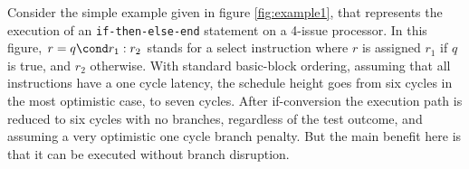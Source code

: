 Consider the simple example given in figure \ref{fig:example1}, that represents the execution of an \texttt{if-then-else-end} statement on a 4-issue processor. In this figure, $r=q\cond r_1:r_2$ stands for a select instruction where $r$ is assigned $r_1$ if $q$ is true, and $r_2$ otherwise. With standard basic-block ordering, assuming that all instructions have a one cycle latency, the schedule height goes from six cycles in the most optimistic case, to seven cycles. After if-conversion the execution path is reduced to six cycles with no branches, regardless of the test outcome, and assuming a very optimistic one cycle branch penalty. But the main benefit here is that it can be executed without branch disruption. 

\begin{figure}


\end{figure}
